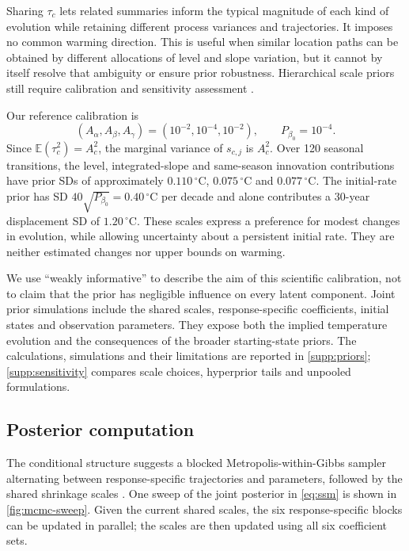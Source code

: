 \documentclass[11pt,a4paper]{article}
\newcommand{\E}{\mathbb E}
\newcommand{\Cdeg}{\,^\circ\mathrm{C}}
\begin{document}
Sharing \(\tau_c\) lets related summaries inform the typical magnitude of
each kind of evolution while retaining different process variances and
trajectories. It imposes no common warming direction. This is useful when
similar location paths can be obtained by different allocations of level
and slope variation, but it cannot by itself resolve that ambiguity or
ensure prior robustness. Hierarchical scale priors still require calibration
and sensitivity assessment \citep{gelman2006,belmonte2014,bitto2019}.

Our reference calibration is
\begin{equation}\label{eq:shrinkage-prior-scales}
(A_\alpha,A_\beta,A_\gamma)=(10^{-2},10^{-4},10^{-2}),
\qquad P_{\beta_0}=10^{-4}.
\end{equation}
Since \(\E(\tau_c^2)=A_c^2\), the marginal variance of
\(s_{c,j}\) is \(A_c^2\). Over 120 seasonal transitions, the level,
integrated-slope and same-season innovation contributions have prior SDs
of approximately \(0.110\Cdeg\), \(0.075\Cdeg\) and \(0.077\Cdeg\).
The initial-rate prior has SD \(40\sqrt{P_{\beta_0}}=0.40\Cdeg\) per
decade and alone contributes a 30-year displacement SD of \(1.20\Cdeg\).
These scales express a preference for modest changes in evolution, while
allowing uncertainty about a persistent initial rate. They are neither
estimated changes nor upper bounds on warming.

We use ``weakly informative'' to describe the aim of this scientific
calibration, not to claim that the prior has negligible influence on every
latent component. Joint prior simulations include the shared scales,
response-specific coefficients, initial states and observation parameters.
They expose both the implied temperature evolution and the consequences of
the broader starting-state priors. The calculations, simulations and their
limitations are reported in \cref{supp:priors};
\cref{supp:sensitivity} compares scale choices, hyperprior tails and
unpooled formulations.

	\subsection{Posterior computation}\label{sec:posterior_computation}

The conditional structure suggests a blocked Metropolis-within-Gibbs
sampler alternating between response-specific trajectories and parameters,
followed by the shared shrinkage scales \citep{fearnhead_sherlock_2026}.
One sweep of the joint posterior in \cref{eq:ssm} is shown in
\cref{fig:mcmc-sweep}. Given the current shared scales, the six
response-specific blocks can be updated in parallel; the scales are then
updated using all six coefficient sets.
\end{document}
